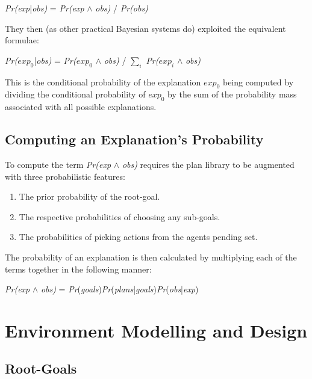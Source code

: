 \documentclass[parskip]{cs4rep}
\begin{document}
\centerline{
\textit{Pr(exp}|\textit{obs)} = \textit{Pr(exp} $\wedge$ \textit{obs)} / \textit{Pr(obs)}
}

They then (as other practical Bayesian systems do) exploited the equivalent formulae:\newline

\centerline{
\textit{Pr($exp_0$}|\textit{obs)} = \textit{Pr($exp_0$} $\wedge$ \textit{obs)} / $\displaystyle\sum\nolimits_{i}$ \textit{Pr($exp_i$} $\wedge$ \textit{obs)}
}

This is the conditional probability of the explanation $exp_0$ being computed by dividing the conditional probability of $exp_0$  by the sum of the probability mass associated with all possible explanations.

\subsection{Computing an Explanation's Probability}

To compute the term \textit{Pr(exp} $\wedge$ \textit{obs)} requires the plan library to be augmented with three probabilistic features:\newline

\begin{enumerate}
\item
The prior probability of the root-goal.
\item
The respective probabilities of choosing any sub-goals.
\item
The probabilities of picking actions from the agents pending set.
\end{enumerate}

The probability of an explanation is then calculated by multiplying each of the terms together in the following manner: \newline

\centerline{
\textit{Pr(exp} $\wedge$ \textit{obs)} = \textit{Pr}(\textit{goals})\textit{Pr}(\textit{plans}|\textit{goals})\textit{Pr}(\textit{obs}|\textit{exp})
}

\section{Environment Modelling and Design}

\subsection{Root-Goals}
\end{document}
